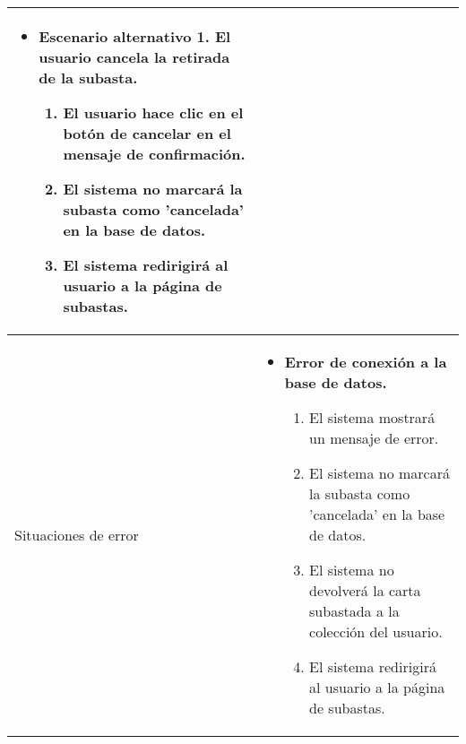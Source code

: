 \begin{longtable}{
    >{\columncolor{lightgreen!20}}p{4cm}
    p{12cm}
    }
\begin{itemize}[nosep,leftmargin=*]
        \item \textbf{Escenario alternativo 1. El usuario cancela la retirada de la subasta.}
        \begin{enumerate}[nosep,leftmargin=*]
            \item El usuario hace clic en el botón de cancelar en el mensaje de confirmación.
            \item El sistema no marcará la subasta como 'cancelada' en la base de datos.
            \item El sistema redirigirá al usuario a la página de subastas.
        \end{enumerate}
    \end{itemize} \\
    \midrule
    Situaciones de error & 
    \begin{itemize}[nosep,leftmargin=*]
        \item \textbf{Error de conexión a la base de datos.}
        \begin{enumerate}[nosep,leftmargin=*]
            \item El sistema mostrará un mensaje de error.
            \item El sistema no marcará la subasta como 'cancelada' en la base de datos.
            \item El sistema no devolverá la carta subastada a la colección del usuario.
            \item El sistema redirigirá al usuario a la página de subastas.
        \end{enumerate}
    \end{itemize} \\
\end{longtable}




